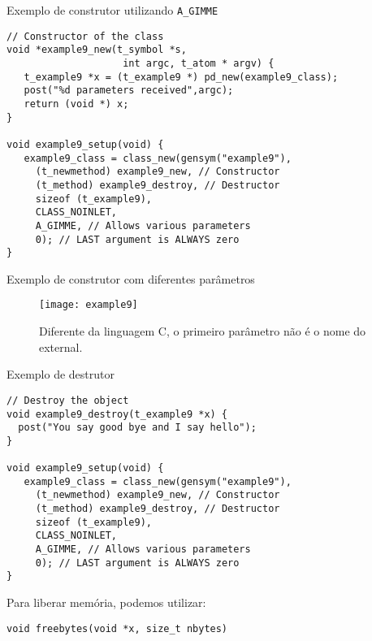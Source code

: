 \begin{frame}[fragile]{Exemplo de construtor utilizando \texttt{A\_GIMME}}
\begin{lstlisting}
// Constructor of the class
void *example9_new(t_symbol *s,
                    int argc, t_atom * argv) {
   t_example9 *x = (t_example9 *) pd_new(example9_class);
   post("%d parameters received",argc);
   return (void *) x;
}

void example9_setup(void) {
   example9_class = class_new(gensym("example9"),
     (t_newmethod) example9_new, // Constructor
     (t_method) example9_destroy, // Destructor
     sizeof (t_example9),
     CLASS_NOINLET,
     A_GIMME, // Allows various parameters
     0); // LAST argument is ALWAYS zero
}
\end{lstlisting}
\end{frame}


\begin{frame}{Exemplo de construtor com diferentes parâmetros}
\begin{figure}[h!]
\centering
\texttt{[image: example9]}
\caption{Diferente da linguagem C, o primeiro parâmetro não é o nome do external.}
\end{figure}
\end{frame}


\begin{frame}[fragile]{Exemplo de destrutor}
\begin{lstlisting}
// Destroy the object
void example9_destroy(t_example9 *x) {
  post("You say good bye and I say hello");
}

void example9_setup(void) {
   example9_class = class_new(gensym("example9"),
     (t_newmethod) example9_new, // Constructor
     (t_method) example9_destroy, // Destructor
     sizeof (t_example9),
     CLASS_NOINLET,
     A_GIMME, // Allows various parameters
     0); // LAST argument is ALWAYS zero
}
\end{lstlisting}
Para liberar memória, podemos utilizar:
\begin{lstlisting}
void freebytes(void *x, size_t nbytes)
\end{lstlisting}
\end{frame}

